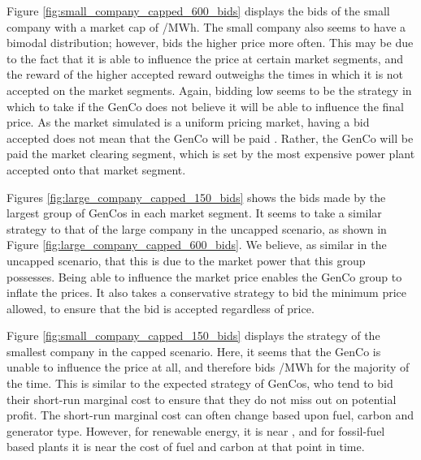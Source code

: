 Figure \ref{fig:small_company_capped_600_bids} displays the bids of the small company with a market cap of /MWh. The small company also seems to have a bimodal distribution; however, bids the higher price more often. This may be due to the fact that it is able to influence the price at certain market segments, and the reward of the higher accepted reward outweighs the times in which it is not accepted on the market segments. Again, bidding low seems to be the strategy in which to take if the GenCo does not believe it will be able to influence the final price. As the market simulated is a uniform pricing market, having a  bid accepted does not mean that the GenCo will be paid . Rather, the GenCo will be paid the market clearing segment, which is set by the most expensive power plant accepted onto that market segment.



Figures \ref{fig:large_company_capped_150_bids} shows the bids made by the largest group of GenCos in each market segment. It seems to take a similar strategy to that of the large company in the uncapped scenario, as shown in Figure \ref{fig:large_company_capped_600_bids}. We believe, as similar in the uncapped scenario, that this is due to the market power that this group possesses. Being able to influence the market price enables the GenCo group to inflate the prices. It also takes a conservative strategy to bid the minimum price allowed, to ensure that the bid is accepted regardless of price.

Figure \ref{fig:small_company_capped_150_bids} displays the strategy of the smallest company in the capped scenario. Here, it seems that the GenCo is unable to influence the price at all, and therefore bids /MWh for the majority of the time. This is similar to the expected strategy of GenCos, who tend to bid their short-run marginal cost to ensure that they do not miss out on potential profit. The short-run marginal cost can often change based upon fuel, carbon and generator type. However, for renewable energy, it is near , and for fossil-fuel based plants it is near the cost of fuel and carbon at that point in time.


